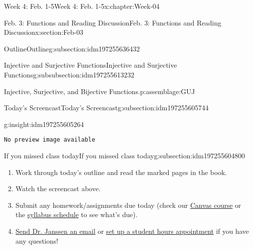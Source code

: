 \documentclass[oneside,10pt,]{book}
\newcommand{\mono}[1]{\texttt{#1}}
\numberwithin{equation}{section}
\newlength{\qrsize}
\newlength{\previewwidth}
\begin{document}
\begin{chapterptx}{Week 4: Feb. 1-5}{}{Week 4: Feb. 1-5}{}{}{x:chapter:Week-04}
\begin{sectionptx}{Feb. 3: Functions and Reading Discussion}{}{Feb. 3: Functions and Reading Discussion}{}{}{x:section:Feb-03}
\begin{subsectionptx}{Outline}{}{Outline}{}{}{g:subsection:idm197255636432}
\begin{subsubsectionptx}{Injective and Surjective Functions}{}{Injective and Surjective Functions}{}{}{g:subsubsection:idm197255613232}
\begin{assemblage}{Injective, Surjective, and Bijective Functions.}{p:assemblage:GUJ}
\end{assemblage}
\end{subsubsectionptx}
\end{subsectionptx}
%
%
\typeout{************************************************}
\typeout{************************************************}
%
\begin{subsectionptx}{Today's Screencast}{}{Today's Screencast}{}{}{g:subsection:idm197255605744}
\begin{insight}{}{g:insight:idm197255605264}%
\setlength{\qrsize}{9em}
\setlength{\previewwidth}{\linewidth}
\addtolength{\previewwidth}{-\qrsize}
\begin{tcbraster}[raster columns=2, raster column skip=1pt, raster halign=center, raster force size=false, raster left skip=0pt, raster right skip=0pt]%
\begin{tcolorbox}[previewstyle, width=\previewwidth]%
\mono{No preview image available}%
\end{tcolorbox}%
\begin{tcolorbox}[qrstyle]%
[QR LINK]\end{tcolorbox}%
\end{tcbraster}%
\end{insight}
\end{subsectionptx}
%
%
\typeout{************************************************}
\typeout{************************************************}
%
\begin{subsectionptx}{If you missed class today}{}{If you missed class today}{}{}{g:subsection:idm197255604800}
%
\begin{enumerate}
\item{}Work through today's outline and read the marked pages in the book.%
\item{}Watch the screencast above.%
\item{}Submit any homework\slash{}assignments due today (check our \href{https://dordt.instructure.com/courses/3110050}{Canvas course} or the \href{https://prof.mkjanssen.org/ds/index.html\#schedule}{syllabus schedule} to see what's due).%
\item{}\href{mailto:mike.janssen@dordt.edu}{Send Dr. Janssen an email} or \href{https://calendly.com/mkjanssen/student-hours}{set up a student hours appointment} if you have any questions!%
\end{enumerate}
\end{subsectionptx}
\end{sectionptx}

\end{chapterptx}
\end{document}
